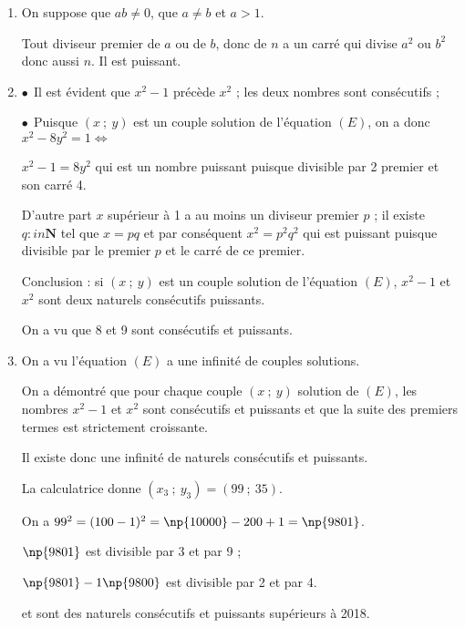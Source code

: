 \documentclass[10pt]{article}
\newcommand{\N}{\textbf{N}}
\begin{document}
\begin{enumerate}[resume]
\item  %

On suppose que $ab\neq 0$, que $a \neq b$ et $a > 1$.

Tout diviseur premier de $a$ ou de $b$, donc de $n$  a un carré qui divise $a^2$ ou $b^2$ donc aussi $n$.
Il est puissant.
\item  %
$\bullet~~$Il est évident que $x^2 - 1$ précède $x^2$ ; les deux nombres sont consécutifs ;

$\bullet~~$Puisque $(x~;~y)$ est un couple solution de l'équation $(E)$, on a donc $x^2 - 8y^2 = 1 \iff$

$ x^2 - 1 = 8y^2$ qui est un nombre puissant puisque divisible par 2  premier et son carré 4.

D'autre part $x$ supérieur à 1 a au moins un diviseur premier $p$ ; il existe $q :in \N$ tel que $x = pq$ et par conséquent $x^2 = p^2q^2$ qui est puissant puisque divisible par le premier $p$ et le carré de ce premier.

Conclusion : si $(x~;~y)$ est un couple solution de l'équation $(E)$, $x^2 - 1$ et $x^2$ sont deux naturels consécutifs puissants.

On a vu que 8 et 9 sont consécutifs et puissants.
\item  %


On a vu l'équation $(E)$ a une infinité de couples solutions.

On a démontré que pour chaque couple $(x~;~y)$ solution de $(E)$, les nombres $x^2 - 1$ et $x^2$ sont consécutifs et puissants et que la suite des premiers termes est strictement croissante.

Il existe donc une infinité de naturels consécutifs et puissants.

La calculatrice donne $\left(x_3~;~y_3\right) = (99~;~35)$.

On a  $99^2 = (100 - 1)^2 = \np{10000} - 200 + 1 = \np{9801}$.

$\np{9801}$ est divisible par 3 et par 9 ;

$\np{9801} - 1 \np{9800}$ est divisible par 2 et par 4.

 et  sont des naturels consécutifs et puissants supérieurs à 2018.
\end{enumerate}
\end{document}
